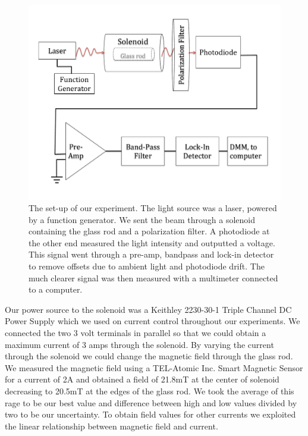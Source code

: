 \documentclass[prb,preprint]{revtex4-1}
\begin{document}
\begin{figure}[h!]
\centering
\includegraphics[width=6in]{Faraday_lab_set-up.pdf}
\caption{The set-up of our experiment. The light source was a laser, powered by a function generator. We sent the beam through a solenoid containing the glass rod and a polarization filter. A photodiode at the other end measured the light intensity and outputted a voltage. This signal went through a pre-amp, bandpass and lock-in detector to remove offsets due to ambient light and photodiode drift. The much clearer signal was then measured with a multimeter connected to a computer.}
\label{set-up}
\end{figure}


Our power source to the solenoid was a Keithley 2230-30-1 Triple Channel DC Power Supply which we used on current control throughout our experiments. We connected the two 3 volt terminals in parallel so that we could obtain a maximum current of 3 amps through the solenoid. By varying the current through the solenoid we could change the magnetic field through the glass rod. We measured the magnetic field using a TEL-Atomic Inc. Smart Magnetic Sensor for a current of 2A and obtained a field of 21.8mT at the center of solenoid decreasing to 20.5mT at the edges of the glass rod. We took the average of this rage to be our best value and difference between high and low values divided by two to be our uncertainty. To obtain field values for other currents we exploited the linear relationship between magnetic field and current.
\end{document}
